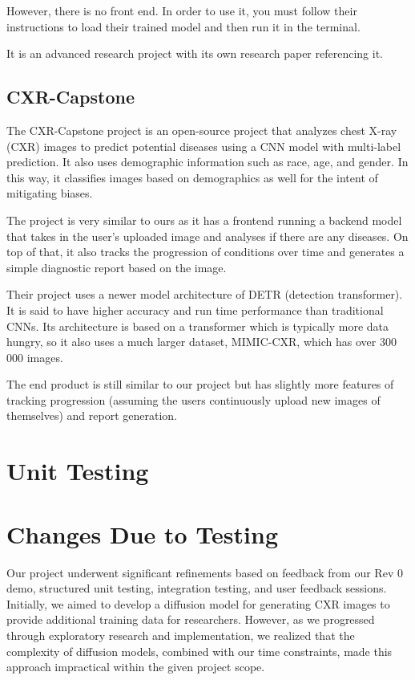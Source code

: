 \documentclass[12pt, titlepage]{article}
\begin{document}
However, there is no front end. In order to use it, you must follow their instructions to load their trained model and then run it in the terminal.

It is an advanced research project with its own research paper referencing it.

\subsection{CXR-Capstone}
The CXR-Capstone project is an open-source project that analyzes chest X-ray (CXR) images to predict potential diseases using a CNN model with multi-label prediction. It also uses demographic information such as race, age, and gender. In this way, it classifies images based on demographics as well for the intent of mitigating biases.

The project is very similar to ours as it has a frontend running a backend model that takes in the user’s uploaded image and analyses if there are any diseases. On top of that, it also tracks the progression of conditions over time and generates a simple diagnostic report based on the image.

Their project uses a newer model architecture of DETR (detection transformer). It is said to have higher accuracy and run time performance than traditional CNNs. Its architecture is based on a transformer which is typically more data hungry, so it also uses a much larger dataset, MIMIC-CXR, which has over 300 000 images.

The end product is still similar to our project but has slightly more features of tracking progression (assuming the users continuously upload new images of themselves) and report generation.


\section{Unit Testing}

\section{Changes Due to Testing}

Our project underwent significant refinements based on feedback from our Rev 0 demo, structured unit testing, integration testing, and user feedback sessions. Initially, we aimed to develop a diffusion model for generating CXR images to provide additional training data for researchers. However, as we progressed through exploratory research and implementation, we realized that the complexity of diffusion models, combined with our time constraints, made this approach impractical within the given project scope.
\end{document}
